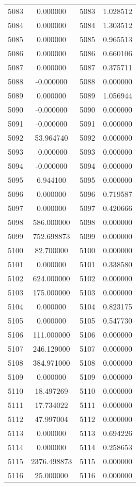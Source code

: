 \documentclass[12pt]{article}
\begin{document}
\begin{longtable}{@{}cccc@{}}
5083 & 0.000000 & 5083 & 1.028512 \\
5084 & 0.000000 & 5084 & 1.303512 \\
5085 & 0.000000 & 5085 & 0.965513 \\
5086 & 0.000000 & 5086 & 0.660106 \\
5087 & 0.000000 & 5087 & 0.375711 \\
5088 & -0.000000 & 5088 & 0.000000 \\
5089 & 0.000000 & 5089 & 1.056944 \\
5090 & -0.000000 & 5090 & 0.000000 \\
5091 & -0.000000 & 5091 & 0.000000 \\
5092 & 53.964740 & 5092 & 0.000000 \\
5093 & -0.000000 & 5093 & 0.000000 \\
5094 & -0.000000 & 5094 & 0.000000 \\
5095 & 6.944100 & 5095 & 0.000000 \\
5096 & 0.000000 & 5096 & 0.719587 \\
5097 & 0.000000 & 5097 & 0.420666 \\
5098 & 586.000000 & 5098 & 0.000000 \\
5099 & 752.698873 & 5099 & 0.000000 \\
5100 & 82.700000 & 5100 & 0.000000 \\
5101 & 0.000000 & 5101 & 0.338580 \\
5102 & 624.000000 & 5102 & 0.000000 \\
5103 & 175.000000 & 5103 & 0.000000 \\
5104 & 0.000000 & 5104 & 0.823175 \\
5105 & 0.000000 & 5105 & 0.547730 \\
5106 & 111.000000 & 5106 & 0.000000 \\
5107 & 246.129000 & 5107 & 0.000000 \\
5108 & 384.971000 & 5108 & 0.000000 \\
5109 & 0.000000 & 5109 & 0.000000 \\
5110 & 18.497269 & 5110 & 0.000000 \\
5111 & 17.734022 & 5111 & 0.000000 \\
5112 & 47.997004 & 5112 & 0.000000 \\
5113 & 0.000000 & 5113 & 0.694226 \\
5114 & 0.000000 & 5114 & 0.258653 \\
5115 & 2376.498873 & 5115 & 0.000000 \\
5116 & 25.000000 & 5116 & 0.000000 \\

\end{longtable}
\end{document}
